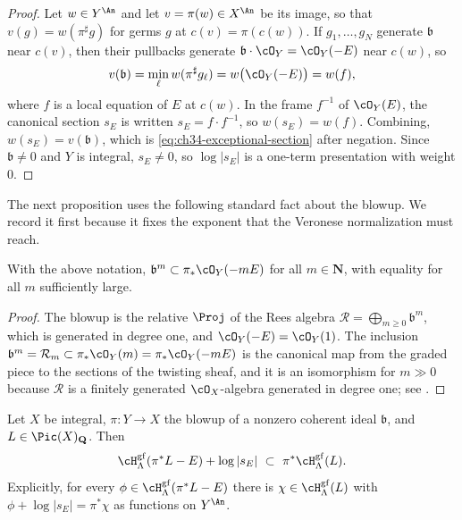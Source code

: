 \begin{proof}
Let $w\in Y^{\An}$ and let $v=\pi(w)\in X^{\An}$ be its image, so that
$v(g)=w(\pi^\sharp g)$ for germs $g$ at $c(v)=\pi(c(w))$.  If
$g_1,\ldots,g_N$ generate $\mathfrak b$ near $c(v)$, then their
pullbacks generate $\mathfrak b\cdot\cO_Y=\cO_Y(-E)$ near $c(w)$, so
\[
 v(\mathfrak b)=\min_\ell w(\pi^\sharp g_\ell)=w\bigl(\cO_Y(-E)\bigr)=w(f),
\]
where $f$ is a local equation of $E$ at $c(w)$.  In the frame
$f^{-1}$ of $\cO_Y(E)$, the canonical section $s_E$ is written
$s_E=f\cdot f^{-1}$, so $w(s_E)=w(f)$.  Combining, $w(s_E)=v(\mathfrak
b)$, which is \eqref{eq:ch34-exceptional-section} after negation.  Since
$\mathfrak b\ne0$ and $Y$ is integral, $s_E\ne0$, so $\log|s_E|$
is a one-term presentation with weight $0$.
\end{proof}

The next proposition uses the following standard fact about the blowup.  We
record it first because it fixes the exponent that the Veronese
normalization must reach.

\begin{lemma}\label{lem:ch34-blowup-pushforward}
With the above notation, $\mathfrak b^m\subset\pi_*\cO_Y(-mE)$ for all
$m\in\mathbf N$, with equality for all $m$ sufficiently large.
\end{lemma}

\begin{proof}
The blowup is the relative $\Proj$ of the Rees algebra
$\mathcal R=\bigoplus_{m\ge0}\mathfrak b^m$, which is generated in degree
one, and $\cO_Y(-E)=\cO_Y(1)$.  The inclusion
$\mathfrak b^m=\mathcal R_m\subset\pi_*\cO_Y(m)=\pi_*\cO_Y(-mE)$ is the
canonical map from the graded piece to the sections of the twisting sheaf,
and it is an isomorphism for $m\gg0$ because $\mathcal R$ is a finitely
generated $\cO_X$-algebra generated in degree one; see
\cite[Exercise~II.5.9]{Har}.
\end{proof}

\begin{proposition}
\label{prop:ch34-blowup-presentation}
Let $X$ be integral, $\pi:Y\to X$ the blowup of a nonzero coherent ideal
$\mathfrak b$, and $L\in\Pic(X)_{\mathbf Q}$.  Then
\begin{equation}
\label{eq:ch34-blowup-presentation}
 \cH^{\mathrm{gf}}_\Lambda(\pi^*L-E)+\log|s_E|
 \ \subset\ \pi^*\cH^{\mathrm{gf}}_\Lambda(L).
\end{equation}
Explicitly, for every $\phi\in\cH^{\mathrm{gf}}_\Lambda(\pi^*L-E)$ there
is $\chi\in\cH^{\mathrm{gf}}_\Lambda(L)$ with
$\phi+\log|s_E|=\pi^*\chi$ as functions on $Y^{\An}$.
\end{proposition}

